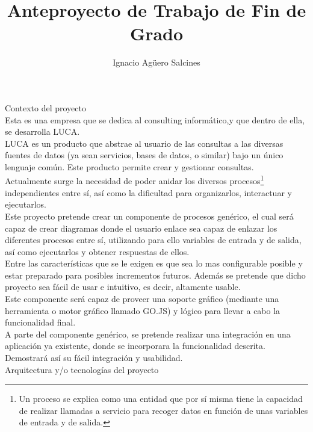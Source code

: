 \documentclass[a4paper,12pt]{article}
\title{Anteproyecto de Trabajo de Fin de Grado}
\author{Ignacio Agüero Salcines}
\begin{document}
	
	\maketitle
	
	\newpage
	
	{\Large Contexto del proyecto}\\
	
Esta es una empresa que se dedica al consulting informático,y que dentro de ella, se desarrolla LUCA.\\


 LUCA es un producto que abstrae al usuario de las consultas a las diversas fuentes de datos (ya sean servicios, bases de datos, o similar) bajo un único lenguaje común. Este producto permite crear y gestionar consultas.\\


 Actualmente surge la necesidad de poder anidar los diversos procesos\footnote{Un proceso se explica como una entidad que por sí misma tiene la capacidad de realizar llamadas a servicio para recoger datos en función de unas variables de entrada y de salida.} independientes entre sí, así como la dificultad para organizarlos, interactuar y ejecutarlos.\\
	
	Este proyecto pretende crear un componente de procesos genérico, el cual será capaz de crear diagramas donde el usuario enlace sea capaz de enlazar los diferentes procesos entre sí, utilizando para ello variables de entrada y de salida, así como ejecutarlos y obtener respuestas de ellos.\\
	
	Entre las características que se le exigen es que sea lo mas configurable posible y estar preparado para posibles incrementos futuros.
	Además se pretende que dicho proyecto sea fácil de usar e intuitivo, es decir, altamente usable.\\
	
	Este componente será capaz de proveer una soporte gráfico (mediante una herramienta o motor gráfico llamado GO.JS) y lógico para llevar a cabo la funcionalidad final.\\
	
	A parte del componente genérico, se pretende realizar una integración en una aplicación ya existente, donde se incorporara la funcionalidad descrita. Demostrará así su fácil integración y usabilidad.\\
	
	\newpage
	{\Large Arquitectura y/o tecnologías del proyecto}\\
	
\end{document}
